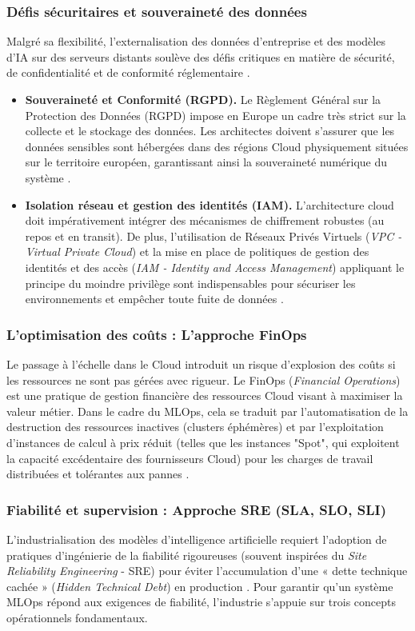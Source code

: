 \subsubsection{Défis sécuritaires et souveraineté des données}
Malgré sa flexibilité, l'externalisation des données d'entreprise et des modèles d'IA sur des serveurs distants soulève des défis critiques en matière de sécurité, de confidentialité et de conformité réglementaire \cite{43, 80}.
\begin{itemize}
    \item[$\bullet$] \textbf{Souveraineté et Conformité (RGPD).} Le Règlement Général sur la Protection des Données (RGPD) impose en Europe un cadre très strict sur la collecte et le stockage des données. Les architectes doivent s'assurer que les données sensibles sont hébergées dans des régions Cloud physiquement situées sur le territoire européen, garantissant ainsi la souveraineté numérique du système \cite{81}.
    \item[$\bullet$] \textbf{Isolation réseau et gestion des identités (IAM).} L'architecture cloud doit impérativement intégrer des mécanismes de chiffrement robustes (au repos et en transit). De plus, l'utilisation de Réseaux Privés Virtuels (\textit{VPC - Virtual Private Cloud}) et la mise en place de politiques de gestion des identités et des accès (\textit{IAM - Identity and Access Management}) appliquant le principe du moindre privilège sont indispensables pour sécuriser les environnements et empêcher toute fuite de données \cite{83}.
\end{itemize}

\subsubsection{L'optimisation des coûts : L'approche FinOps}
Le passage à l'échelle dans le Cloud introduit un risque d'explosion des coûts si les ressources ne sont pas gérées avec rigueur. Le FinOps (\textit{Financial Operations}) est une pratique de gestion financière des ressources Cloud visant à maximiser la valeur métier. Dans le cadre du MLOps, cela se traduit par l'automatisation de la destruction des ressources inactives (clusters éphémères) et par l'exploitation d'instances de calcul à prix réduit (telles que les instances "Spot", qui exploitent la capacité excédentaire des fournisseurs Cloud) pour les charges de travail distribuées et tolérantes aux pannes \cite{43, 76}.


\subsubsection{Fiabilité et supervision : Approche SRE (SLA, SLO, SLI)}
L'industrialisation des modèles d'intelligence artificielle requiert l'adoption de pratiques d'ingénierie de la fiabilité rigoureuses (souvent inspirées du \textit{Site Reliability Engineering} - SRE) pour éviter l'accumulation d'une « dette technique cachée » (\textit{Hidden Technical Debt}) en production \cite{82}. Pour garantir qu'un système MLOps répond aux exigences de fiabilité, l'industrie s'appuie sur trois concepts opérationnels fondamentaux.

